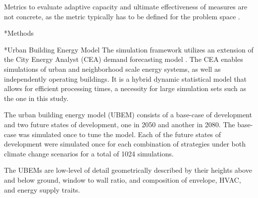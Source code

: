 \documentclass[twocolumn, a4paper,10pt]{article}
\makeatletter
\renewcommand\section{\@startsection{section}{1}{\z@}{3pt}{3pt}{\normalfont\large\bfseries}}
\renewcommand\subsection{\@startsection{subsection}{1}{\z@}{\z@}{\z@}{\normalfont\normalsize\bfseries}}
\renewcommand\subsection{\@startsection{subsection}{1}{\z@}{\z@}{0.1pt}{\normalfont\normalsize\bfseries}}
\makeatother
\begin{document}
Metrics to evaluate adaptive capacity and ultimate effectiveness of measures are not concrete, as the metric typically has to be defined for the problem space \citep{brooks 2011}. 


\section*{Methods}

\subsection*{Urban Building Energy Model}
The simulation framework utilizes an extension of the City Energy Analyst (CEA) demand forecasting model \citep{CEA, Fonseca1, Fonseca2}. The CEA enables simulations of urban and neighborhood scale energy systems, as well as independently operating buildings. It is a hybrid dynamic statistical model that allows for efficient processing times, a necessity for large simulation sets such as the one in this study.

The urban building energy model (UBEM) consists of a base-case of development and two future states of development, one in 2050 and another in 2080. The base-case was simulated once to tune the model. Each of the future states of development were simulated once for each combination of strategies under both climate change scenarios for a total of 1024 simulations.  

The UBEMs are low-level of detail geometrically described by their heights above and below ground, window to wall ratio, and composition of envelope, HVAC, and energy supply traits. 

\end{document}
